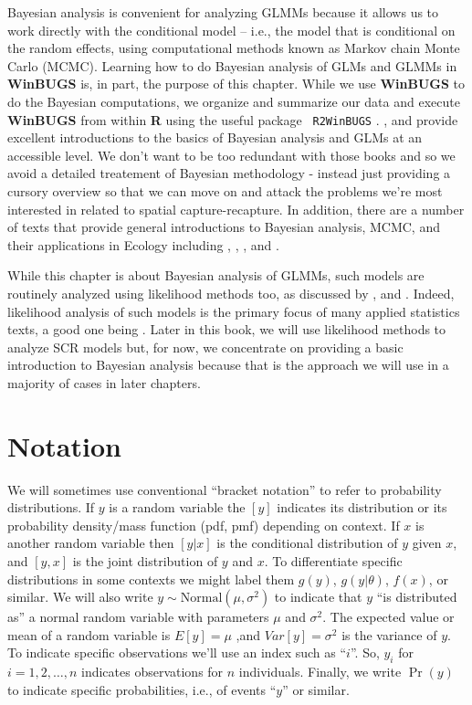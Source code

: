Bayesian analysis is convenient for analyzing GLMMs because it allows
us to work directly with the conditional model -- i.e., the model that
is conditional on the random effects, using computational methods
known as Markov chain Monte Carlo (MCMC). Learning how to do Bayesian
analysis of GLMs and GLMMs in {\bf WinBUGS} is, in part, the purpose
of this chapter.  While we use {\bf WinBUGS} to do the Bayesian
computations, we organize and summarize our data and execute {\bf
  WinBUGS} from within {\bf R} using the useful package \mbox{\tt
  R2WinBUGS} \citep{sturtz_etal:2005}.  \citet{kery:2010}, and
\citet{kery_schaub:2011} provide excellent introductions to the basics
of Bayesian analysis and GLMs at an accessible level. We don't want to
be too redundant with those books and so we avoid a detailed
treatement of Bayesian methodology - instead just providing a cursory
overview so that we can move on and attack the problems we're most
interested in related to spatial capture-recapture.  In addition,
there are a number of texts that provide general introductions to
Bayesian analysis, MCMC, and their applications in Ecology including
\citet{mccarthy:2007}, \citet{kery:2010}, \citet{link_barker:2009}, and
\citet{king_etal:2009}.


While this chapter is about Bayesian analysis of GLMMs, such models
are routinely analyzed using likelihood methods too, as discussed by
\citet{royle_dorazio:2008}, and \citet{kery:2010}. Indeed, likelihood
analysis of such models is the primary focus of many applied
statistics texts, a good one being \citet{zuur_etal:2009}. Later in
this book, we will use likelihood methods to analyze SCR models but,
for now, we concentrate on providing a basic introduction to Bayesian
analysis because that is the approach we will use in a majority of
cases in later chapters.


\section{ Notation}

We will sometimes use conventional ``bracket notation''  to refer to
probability distributions. If $y$ is a random variable the $[y]$
indicates its distribution or its probability density/mass function
(pdf, pmf) depending on context. If $x$ is another random variable
then $[y|x]$ is the conditional distribution of $y$ given $x$, and
$[y,x]$ is the joint distribution of $y$ and $x$. To differentiate
specific distributions in some contexts we might label them $g(y)$,
$g(y|\theta)$, $f(x)$, or similar. We will also write $y \sim
\mbox{Normal}(\mu,\sigma^{2})$ to indicate that $y$ ``is distributed as'' a normal
random variable with parameters $\mu$ and $\sigma^{2}$. The expected value
or mean of a random variable is $E[y] = \mu$ ,and $Var[y] = \sigma^{2}$ is
the variance of $y$.  To indicate specific observations we'll use an
index such as ``$i$''. So, $y_{i}$ for $i=1,2,\ldots,n$ indicates
observations for $n$ individuals. Finally, we write $\Pr(y)$ to indicate specific probabilities, i.e., of events ``$y$'' or similar.



